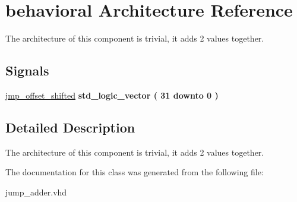\hypertarget{classjump__adder_1_1behavioral}{\section{behavioral \-Architecture \-Reference}
\label{classjump__adder_1_1behavioral}
}


\-The architecture of this component is trivial, it adds 2 values together.  


\*
\*
\subsection*{\-Signals}
 \begin{DoxyCompactItemize}
\item 
\hypertarget{classjump__adder_1_1behavioral_ae087ef06435fa2f9d0677928ca02358e}{\hyperlink{classjump__adder_1_1behavioral_ae087ef06435fa2f9d0677928ca02358e}{jmp\-\_\-offset\-\_\-shifted} {\bfseries std\-\_\-logic\-\_\-vector (   31    downto    0  ) } }\label{classjump__adder_1_1behavioral_ae087ef06435fa2f9d0677928ca02358e}

\end{DoxyCompactItemize}


\subsection{\-Detailed \-Description}
\-The architecture of this component is trivial, it adds 2 values together. 

\-The documentation for this class was generated from the following file\-:\begin{DoxyCompactItemize}
\item 
jump\-\_\-adder.\-vhd\end{DoxyCompactItemize}
